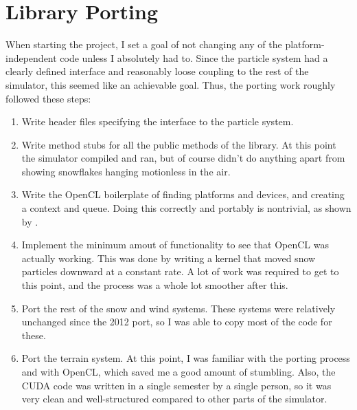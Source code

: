 \section{Library Porting}
When starting the project, I set a goal of not changing any of the platform-independent code unless I absolutely had to. Since the particle system had a clearly defined interface and reasonably loose coupling to the rest of the simulator, this seemed like an achievable goal. Thus, the porting work roughly followed these steps:
\begin{enumerate}
\item Write header files specifying the interface to the particle system.
\item Write method stubs for all the public methods of the library. At this point the simulator compiled and ran, but of course didn’t do anything apart from showing snowflakes hanging motionless in the air.
\item Write the OpenCL boilerplate of finding platforms and devices, and creating a context and queue. Doing this correctly and portably is nontrivial, as shown by \citet{fastkor2012boilerplate}.
\item Implement the minimum amout of functionality to see that OpenCL was actually working. This was done by writing a kernel that moved snow particles downward at a constant rate. A lot of work was required to get to this point, and the process was a whole lot smoother after this. 
\item Port the rest of the snow and wind systems. These systems were relatively unchanged since the 2012 port, so I was able to copy most of the code for these.
\item Port the terrain system. At this point, I was familiar with the porting process and with OpenCL, which saved me a good amount of stumbling. Also, the CUDA code was written in a single semester by a single person, so it was very clean and well-structured compared to other parts of the simulator.
\end{enumerate}